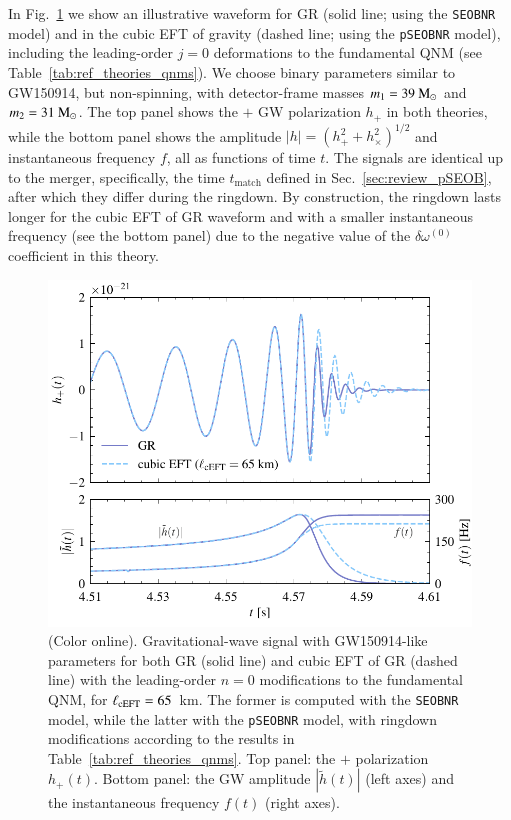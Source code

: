 \documentclass[twocolumn,
               prd,
               aps,
               superscriptaddress,
               tightenlines,
               nofootinbib,
               eqsecnum,
               amsfonts,
               amsmath,
               longbibliography]{revtex4-1}
\newcommand{\pSEOB}{\texttt{pSEOBNR}}
\newcommand{\SEOB}{\texttt{SEOBNR}}
\newcommand{\msun}{~{\rm M}_{\odot}}
\begin{document}
In Fig.~\ref{fig:example_waveform} we show an illustrative waveform for GR (solid line; using the \texttt{SEOBNR} model) and in the cubic EFT of gravity (dashed line; using the \pSEOB{} model),
including the leading-order $j = 0$ deformations to the fundamental QNM (see Table~\ref{tab:ref_theories_qnms}).
%
We choose binary parameters similar to GW150914,  but non-spinning, with detector-frame masses
$m_1 = 39\msun$ and $m_2 = 31\msun$.
%
The top panel shows the $+$ GW polarization $h_{+}$ in both theories,
while the bottom panel shows the amplitude $|h| = (h_{+}^2 + h_{\times}^2)^{1/2}$
and instantaneous frequency $f$, all as functions of time $t$.
%
The signals are identical up to the merger, specifically, the time $t_\textrm{match}$
defined in Sec.~\ref{sec:review_pSEOB}, after which they differ during the ringdown.
%
By construction, the ringdown lasts longer for the cubic EFT of GR waveform and
with a smaller instantaneous frequency (see the bottom panel) due to the negative value of the
$\delta\omega^{(0)}$ coefficient in this theory.

\begin{figure}[t]
\includegraphics[width=\columnwidth]{figs/example_waveform_cubicEFT.pdf}
\caption{(Color online). Gravitational-wave signal with GW150914-like parameters
for both GR (solid line) and cubic EFT of GR (dashed line) with the leading-order
$n=0$ modifications to the fundamental QNM, for $\ell_{\rm cEFT} = 65$~km.
%
The former is computed with the \SEOB{} model, while the latter with the
\pSEOB{} model, with ringdown modifications according to the results in
Table~\ref{tab:ref_theories_qnms}.
%
Top panel: the $+$ polarization $h_{+}(t)$. Bottom panel: the GW amplitude
$|\tilde{h}(t)|$ (left axes) and the instantaneous frequency $f(t)$ (right axes).
}
\label{fig:example_waveform}
\end{figure}
\end{document}
